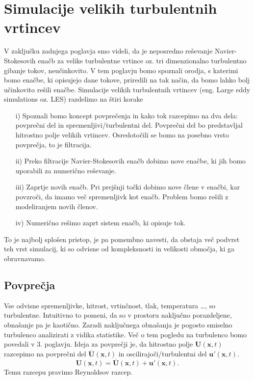 \documentclass[mat2, tisk]{fmfdelo}
\newcommand{\bd}{\textbf}
\begin{document}
\newpage
\section{Simulacije velikih turbulentnih vrtincev}

V zaključku zadnjega poglavja smo videli, da je neposredno reševanje Navier-\\Stokesovih enačb
za velike turbulentne vrtince oz. tri dimenzionalno turbulentno gibanje tokov, neučinkovito. V tem poglavju 
bomo spoznali orodja, s katerimi bomo enačbe, ki opisujejo dane tokove, priredili na tak
način, da bomo lahko bolj učinkovito rešili enačbe. Simulacije velikih turbulentnih vrtincev (eng. 
Large eddy simulations oz. LES) razdelimo na štiri korake 
\begin{enumerate}
\item[i)] Spoznali bomo koncept povprečenja in kako tok razcepimo na dva dela: 
povprečni del in spremenljivi/turbulentni del. Povprečni del bo predstavljal hitrostno polje 
velikih vrtincev. Osredotočili se bomo na posebno vrsto povprečja, to je filtracija.
\item[ii)] Preko filtracije Navier-Stokesovih enačb dobimo nove enačbe, ki jih bomo 
uporabili za numerično reševanje. 
\item[iii)] Zaprtje novih enačb. Pri prejšnji točki dobimo nove člene v enačbi, kar 
povzroči, da imamo več spremenljivk kot enačb. Problem bomo rešili z modeliranjem 
novih členov.
\item[iv)] Numerično rešimo zaprt sistem enačb, ki opisuje tok.
\end{enumerate}

To je najbolj splošen pristop, je pa pomembno navesti, da obstaja več podvrst teh vrst simulacij, 
ki so odvisne od kompleksnosti in velikosti območja, ki ga obravnavamo.

\subsection{Povprečja}

Vse odvisne spremenljivke, hitrost, vrtinčnost, tlak, temperatura \dots, so turbulentne.
Intuitivno to pomeni, da so v prostoru naključno porazdeljene, obnašanje pa je kaotično.
Zaradi naključnega obnašanja je pogosto smiselno turbulenco 
analizirati z vidika statistike. Več o tem pogledu na turbulenco bomo povedali v $3$. poglavju. 
Ideja za povprečji je, da hitrostno polje $\bd{U}(\bd{x}, t)$ razcepimo na povprečni del $\overline{\bd{U}}(\bd{x}, t)$ in 
oscilirajoči/turbulentni del $\bd{u}'(\bd{x}, t)$.
\begin{equation}
\bd{U}(\bd{x}, t) = \overline{\bd{U}}(\bd{x},t) + \bd{u}'(\bd{x}, t).
\end{equation}
Temu razcepu pravimo Reynoldsov razcep.
\end{document}
